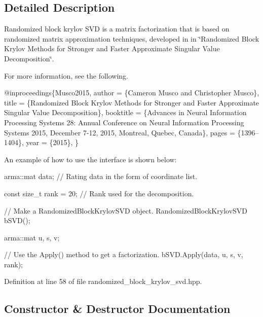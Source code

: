 \subsection{Detailed Description}
Randomized block krylov S\+VD is a matrix factorization that is based on randomized matrix approximation techniques, developed in in \char`\"{}\+Randomized Block Krylov Methods for Stronger and Faster Approximate
\+Singular Value Decomposition\char`\"{}. 

For more information, see the following.


\begin{DoxyCode}
@inproceedings\{Musco2015,
  author    = \{Cameron Musco and Christopher Musco\},
  title     = \{Randomized Block Krylov Methods \textcolor{keywordflow}{for} Stronger and Faster
               Approximate Singular Value Decomposition\},
  booktitle = \{Advances in Neural Information Processing Systems 28: Annual
               Conference on Neural Information Processing Systems 2015,
               December 7-12, 2015, Montreal, Quebec, Canada\},
  pages     = \{1396--1404\},
  year      = \{2015\},
\}
\end{DoxyCode}


An example of how to use the interface is shown below\+:


\begin{DoxyCode}
arma::mat data; \textcolor{comment}{// Rating data in the form of coordinate list.}

\textcolor{keyword}{const} \textcolor{keywordtype}{size\_t} rank = 20; \textcolor{comment}{// Rank used for the decomposition.}

\textcolor{comment}{// Make a RandomizedBlockKrylovSVD object.}
RandomizedBlockKrylovSVD bSVD();

arma::mat u, s, v;

\textcolor{comment}{// Use the Apply() method to get a factorization.}
bSVD.Apply(data, u, s, v, rank);
\end{DoxyCode}
 

Definition at line 58 of file randomized\+\_\+block\+\_\+krylov\+\_\+svd.\+hpp.



\subsection{Constructor \& Destructor Documentation}
\mbox{\label{classmlpack_1_1svd_1_1RandomizedBlockKrylovSVD_aa1fb3c7372e3ca685cf926865c214150}} 
